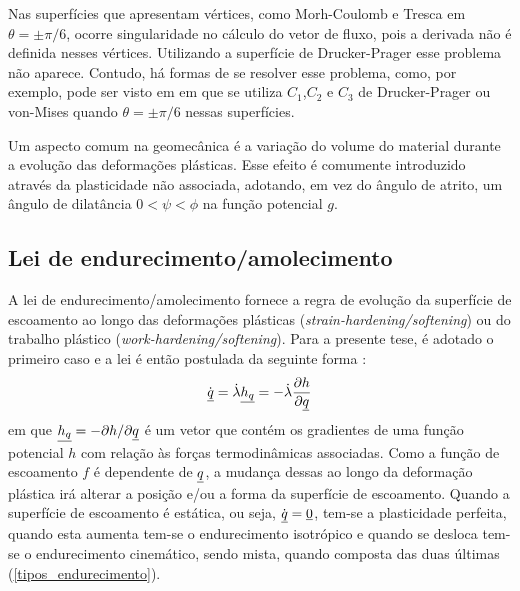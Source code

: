 Nas superfícies que apresentam vértices, como Morh-Coulomb e Tresca em $\theta = \pm \pi/6$, ocorre singularidade no cálculo do vetor de fluxo, pois a derivada não é definida nesses vértices. Utilizando a superfície de Drucker-Prager esse problema não aparece. Contudo, há formas de se resolver esse problema, como, por exemplo, pode ser visto em  em que se utiliza $C_1$,$C_2$ e $C_3$ de Drucker-Prager ou von-Mises quando $\theta = \pm \pi/6$ nessas superfícies.

Um aspecto comum na geomecânica é a variação do volume do material durante a evolução das deformações plásticas. Esse efeito é comumente introduzido através da plasticidade não associada, adotando, em vez do ângulo de atrito, um ângulo de dilatância $0<\psi<\phi$  na função potencial $g$.

\subsection{Lei de endurecimento/amolecimento}
A lei de endurecimento/amolecimento fornece a regra de evolução da superfície de escoamento ao longo das deformações plásticas (\textit{strain-hardening/softening}) ou do trabalho plástico (\textit{work-hardening/softening}). Para a presente tese, é adotado o primeiro caso e a lei é então postulada da seguinte forma \cite[p. 249]{Belytschko2000}:
\begin{equation}
	\label{eq:amolecimento}
	\dot {\underline q} = \dot \lambda \underline{h_q} = - \dot \lambda \dfrac{\partial h}{\partial \underline q}
\end{equation}
em que $\underline{h_q} = - \partial h / \partial \underline q$ é um vetor que contém os gradientes de uma função potencial $h$ com relação às forças termodinâmicas associadas. Como a função de escoamento $f$ é dependente de $\underline q$, a mudança dessas ao longo da deformação plástica irá alterar a posição e/ou a forma da superfície de escoamento. Quando a superfície de escoamento é estática, ou seja, $\dot {\underline q}=\underline 0$, tem-se a plasticidade perfeita, quando esta aumenta tem-se o endurecimento isotrópico e quando se desloca tem-se o endurecimento cinemático, sendo mista, quando composta das duas últimas (\autoref{tipos_endurecimento}).

